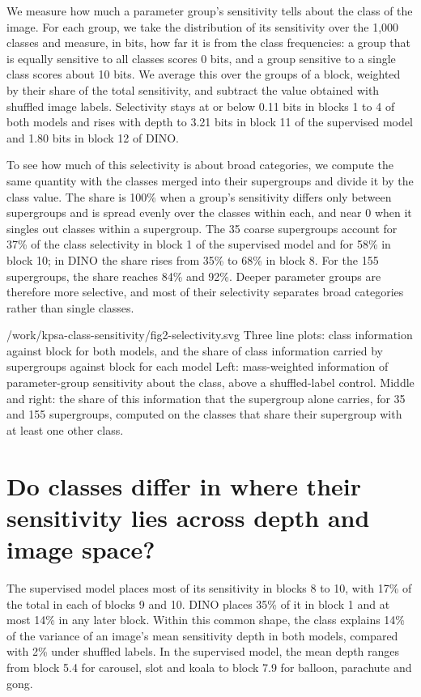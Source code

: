 \documentclass[11pt]{article}
\begin{document}
We measure how much a parameter group's sensitivity tells about the class of the image. For each group, we take the distribution of its sensitivity over the 1,000 classes and measure, in bits, how far it is from the class frequencies: a group that is equally sensitive to all classes scores 0 bits, and a group sensitive to a single class scores about 10 bits. We average this over the groups of a block, weighted by their share of the total sensitivity, and subtract the value obtained with shuffled image labels. Selectivity stays at or below 0.11 bits in blocks 1 to 4 of both models and rises with depth to 3.21 bits in block 11 of the supervised model and 1.80 bits in block 12 of DINO.

To see how much of this selectivity is about broad categories, we compute the same quantity with the classes merged into their supergroups and divide it by the class value. The share is 100\% when a group's sensitivity differs only between supergroups and is spread evenly over the classes within each, and near 0 when it singles out classes within a supergroup. The 35 coarse supergroups account for 37\% of the class selectivity in block 1 of the supervised model and for 58\% in block 10; in DINO the share rises from 35\% to 68\% in block 8. For the 155 supergroups, the share reaches 84\% and 92\%. Deeper parameter groups are therefore more selective, and most of their selectivity separates broad categories rather than single classes.

  {/work/kpsa-class-sensitivity/fig2-selectivity.svg}
  {Three line plots: class information against block for both models, and the share of class information carried by supergroups against block for each model}
  {Left: mass-weighted information of parameter-group sensitivity about the class, above a shuffled-label control. Middle and right: the share of this information that the supergroup alone carries, for 35 and 155 supergroups, computed on the classes that share their supergroup with at least one other class.}

\section{Do classes differ in where their sensitivity lies across depth and image space?}\label{depth-space}

The supervised model places most of its sensitivity in blocks 8 to 10, with 17\% of the total in each of blocks 9 and 10. DINO places 35\% of it in block 1 and at most 14\% in any later block. Within this common shape, the class explains 14\% of the variance of an image's mean sensitivity depth in both models, compared with 2\% under shuffled labels. In the supervised model, the mean depth ranges from block 5.4 for carousel, slot and koala to block 7.9 for balloon, parachute and gong.
\end{document}

